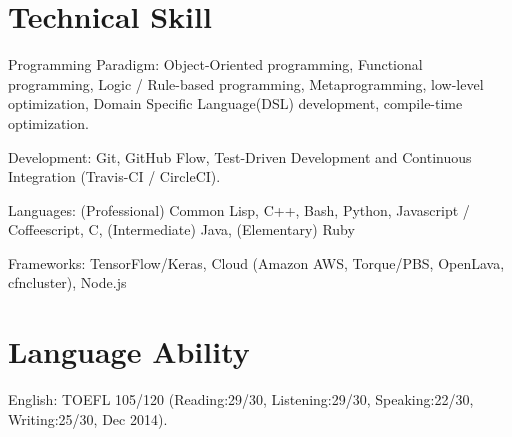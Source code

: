 \documentclass[letterpaper,11pt]{article}
\begin{document}
\renewcommand{\refname}{Selected Publications}

{
\let\uline\relax
\nocite{Asai2017e}
\nocite{Asai2017c}
\nocite{Asai2017b}
\nocite{Asai2017}
\nocite{Endo2016}
\nocite{Asai2016}
\nocite{Asai2015}
\nocite{Asai2014}




}




\section{Technical Skill}

\begin{CV}
 \item[Programming Paradigm:] %
 Object-Oriented programming,
 Functional programming,
 Logic / Rule-based programming,
 Metaprogramming, low-level optimization,
 Domain Specific Language(DSL) development, compile-time optimization.
 \item[Development:] Git, GitHub Flow, Test-Driven Development and Continuous Integration (Travis-CI / CircleCI).
 \item[Languages:]
 (Professional) Common Lisp, C++, Bash, Python, Javascript / Coffeescript, C,
 (Intermediate) Java,
 (Elementary)   Ruby
 \item[Frameworks:] TensorFlow/Keras, Cloud (Amazon AWS, Torque/PBS, OpenLava, cfncluster),
 Node.js%
\end{CV}

\section{Language Ability}

\begin{CV}
 \item[English:] TOEFL 105/120 (Reading:29/30, Listening:29/30,
 Speaking:22/30, Writing:25/30, Dec 2014).
\end{CV}
\end{document}
